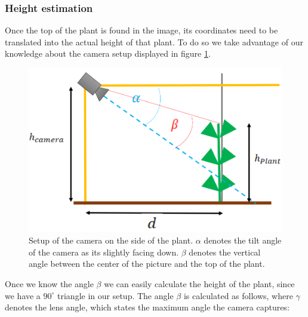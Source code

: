 \subsubsection{Height estimation}
Once the top of the plant is found in the image, its coordinates need to be translated into the actual height of that plant. To do so we take advantage of our knowledge about the camera setup displayed in figure \ref{fig:estHeight}.
   \begin{figure}[H]
       \centering
       \includegraphics[scale=0.6]{estHeight.PNG}
       \caption{Setup of the camera on the side of the plant. $\alpha$ denotes the tilt angle of the camera as its slightly facing down. $\beta$ denotes the vertical angle between the center of the picture and the top of the plant. }
       \label{fig:estHeight}
   \end{figure}
Once we know the angle $\beta$ we can easily calculate the height of the plant, since we have a $90^{\circ}$ triangle in our setup. The angle $\beta$ is calculated as follows, where $\gamma$ denotes the lens angle, which states the maximum angle the camera captures:\\
